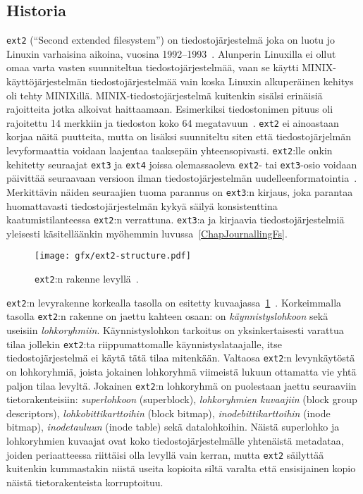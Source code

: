 \subsection{Historia}

\texttt{ext2} (``Second extended filesystem'') on tiedostojärjestelmä joka on luotu jo Linuxin varhaisina aikoina, vuosina 1992--1993~\cite{Ext2Design}.
Alunperin Linuxilla ei ollut omaa varta vasten suunniteltua tiedostojärjestelmää,
vaan se käytti MINIX-käyttöjärjestelmän tiedostojärjestelmää vain koska Linuxin alkuperäinen kehitys oli tehty MINIXillä.
MINIX-tiedostojärjestelmä kuitenkin sisälsi erinäisiä rajoitteita jotka alkoivat haittaamaan.
Esimerkiksi tiedostonimen pituus oli rajoitettu 14 merkkiin ja tiedoston koko 64 megatavuun~\cite{Ext2Design}.
\texttt{ext2} ei ainoastaan korjaa näitä puutteita,
mutta on lisäksi suunniteltu siten että tiedostojärjelmän levyformaattia voidaan laajentaa taaksepäin yhteensopivasti.
\texttt{ext2}:lle onkin kehitetty seuraajat \texttt{ext3} ja \texttt{ext4} joissa olemassaoleva \texttt{ext2}- tai \texttt{ext3}-osio voidaan päivittää seuraavaan
versioon ilman tiedostojärjestelmän uudelleenformatointia~\cite{Ext4Status}.
Merkittävin näiden seuraajien tuoma parannus on \texttt{ext3}:n kirjaus,
joka parantaa huomattavasti tiedostojärjestelmän kykyä säilyä konsistenttina kaatumistilanteessa \texttt{ext2}:n verrattuna.
\texttt{ext3}:a ja kirjaavia tiedostojärjestelmiä yleisesti käsitelläänkin myöhemmin luvussa~\ref{ChapJournallingFs}.

\begin{figure}
    \label{FigExt2DiskFormat}
    \centering
    \texttt{[image: gfx/ext2-structure.pdf]}
    \caption{\texttt{ext2}:n rakenne levyllä~\cite{LinuxKernelBook}.}
\end{figure}

\texttt{ext2}:n levyrakenne korkealla tasolla on esitetty kuvaajassa~\ref{FigExt2DiskFormat}~\cite{LinuxKernelBook}.
Korkeimmalla tasolla \texttt{ext2}:n rakenne on jaettu kahteen osaan: on \emph{käynnistyslohkoon} sekä useisiin \emph{lohkoryhmiin}.
Käynnistyslohkon tarkoitus on yksinkertaisesti varattua tilaa jollekin \texttt{ext2}:ta riippumattomalle käynnistyslataajalle,
itse tiedostojärjestelmä ei käytä tätä tilaa mitenkään.
Valtaosa \texttt{ext2}:n levynkäytöstä on lohkoryhmiä,
joista jokainen lohkoryhmä viimeistä lukuun ottamatta vie yhtä paljon tilaa levyltä.
Jokainen \texttt{ext2}:n lohkoryhmä on puolestaan jaettu seuraaviin tietorakenteisiin:
\emph{superlohkoon} (superblock),
\emph{lohkoryhmien kuvaajiin} (block group descriptors),
\emph{lohkobittikarttoihin} (block bitmap),
\emph{inodebittikarttoihin} (inode bitmap),
\emph{inodetauluun} (inode table) sekä datalohkoihin.
Näistä superlohko ja lohkoryhmien kuvaajat ovat koko tiedostojärjestelmälle yhtenäistä metadataa,
joiden periaatteessa riittäisi olla levyllä vain kerran,
mutta \texttt{ext2} säilyttää kuitenkin kummastakin niistä useita kopioita siltä varalta että ensisijainen kopio näistä tietorakenteista korruptoituu.

